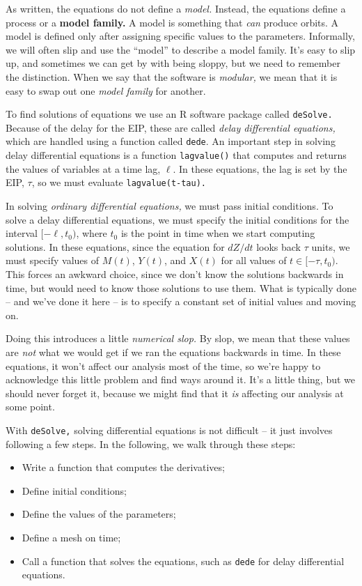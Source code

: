 \documentclass[
]{book}
\begin{document}
As written, the equations do not define a \emph{model.} Instead, the equations define a process or a \textbf{model family.} A model is something that \emph{can} produce orbits. A model is defined only after assigning specific values to the parameters. Informally, we will often slip and use the ``model'' to describe a model family. It's easy to slip up, and sometimes we can get by with being sloppy, but we need to remember the distinction. When we say that the software is \emph{modular,} we mean that it is easy to swap out one \emph{model family} for another.

To find solutions of equations we use an R software package called \texttt{deSolve.} Because of the delay for the EIP, these are called \emph{delay differential equations,} which are handled using a function called \texttt{dede}. An important step in solving delay differential equations is a function \texttt{lagvalue()} that computes and returns the values of variables at a time lag, \(\ell\). In these equations, the lag is set by the EIP, \(\tau\), so we must evaluate
\texttt{lagvalue(t-tau).}

In solving \emph{ordinary differential equations,} we must pass initial conditions. To solve a delay differential equations, we must specify the initial conditions for the interval \([-\ell, t_0)\), where \(t_0\) is the point in time when we start computing solutions.
In these equations, since the equation for \(dZ/dt\) looks back \(\tau\) units, we must specify values of \(M(t)\), \(Y(t)\), and \(X(t)\) for all values of \(t \in [-\tau, t_0)\). This forces an awkward choice, since we don't know the solutions backwards in time, but would need to know those solutions to use them. What is typically done -- and we've done it here -- is to specify a constant set of initial values and moving on.

Doing this introduces a little \emph{numerical slop.} By slop, we mean that these values are \emph{not} what we would get if we ran the equations backwards in time. In these equations, it won't affect our analysis most of the time, so we're happy to acknowledge this little problem and find ways around it. It's a little thing, but we should never forget it, because we might find that it \emph{is} affecting our analysis at some point.

With \texttt{deSolve,} solving differential equations is not difficult -- it just involves following a few steps. In the following, we walk through these steps:

\begin{itemize}
\item
  Write a function that computes the derivatives;
\item
  Define initial conditions;
\item
  Define the values of the parameters;
\item
  Define a mesh on time;
\item
  Call a function that solves the equations, such as \texttt{dede} for delay differential equations.
\end{itemize}
\end{document}
